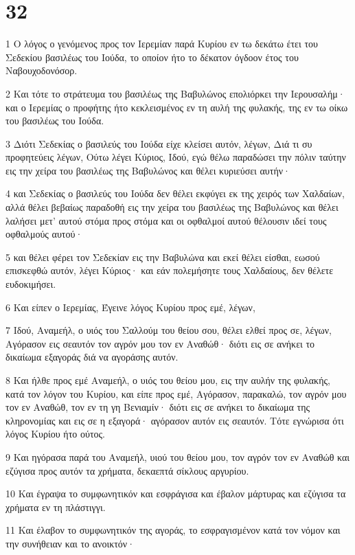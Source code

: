 \chapter{32}

\par 1 Ο λόγος ο γενόμενος προς τον Ιερεμίαν παρά Κυρίου εν τω δεκάτω έτει του Σεδεκίου βασιλέως του Ιούδα, το οποίον ήτο το δέκατον όγδοον έτος του Ναβουχοδονόσορ.
\par 2 Και τότε το στράτευμα του βασιλέως της Βαβυλώνος επολιόρκει την Ιερουσαλήμ· και ο Ιερεμίας ο προφήτης ήτο κεκλεισμένος εν τη αυλή της φυλακής, της εν τω οίκω του βασιλέως του Ιούδα.
\par 3 Διότι Σεδεκίας ο βασιλεύς του Ιούδα είχε κλείσει αυτόν, λέγων, Διά τι συ προφητεύεις λέγων, Ούτω λέγει Κύριος, Ιδού, εγώ θέλω παραδώσει την πόλιν ταύτην εις την χείρα του βασιλέως της Βαβυλώνος και θέλει κυριεύσει αυτήν·
\par 4 και Σεδεκίας ο βασιλεύς του Ιούδα δεν θέλει εκφύγει εκ της χειρός των Χαλδαίων, αλλά θέλει βεβαίως παραδοθή εις την χείρα του βασιλέως της Βαβυλώνος και θέλει λαλήσει μετ' αυτού στόμα προς στόμα και οι οφθαλμοί αυτού θέλουσιν ιδεί τους οφθαλμούς αυτού·
\par 5 και θέλει φέρει τον Σεδεκίαν εις την Βαβυλώνα και εκεί θέλει είσθαι, εωσού επισκεφθώ αυτόν, λέγει Κύριος· και εάν πολεμήσητε τους Χαλδαίους, δεν θέλετε ευδοκιμήσει.
\par 6 Και είπεν ο Ιερεμίας, Έγεινε λόγος Κυρίου προς εμέ, λέγων,
\par 7 Ιδού, Αναμεήλ, ο υιός του Σαλλούμ του θείου σου, θέλει ελθεί προς σε, λέγων, Αγόρασον εις σεαυτόν τον αγρόν μου τον εν Αναθώθ· διότι εις σε ανήκει το δικαίωμα εξαγοράς διά να αγοράσης αυτόν.
\par 8 Και ήλθε προς εμέ Αναμεήλ, ο υιός του θείου μου, εις την αυλήν της φυλακής, κατά τον λόγον του Κυρίου, και είπε προς εμέ, Αγόρασον, παρακαλώ, τον αγρόν μου τον εν Αναθώθ, τον εν τη γη Βενιαμίν· διότι εις σε ανήκει το δικαίωμα της κληρονομίας και εις σε η εξαγορά· αγόρασον αυτόν εις σεαυτόν. Τότε εγνώρισα ότι λόγος Κυρίου ήτο ούτος.
\par 9 Και ηγόρασα παρά του Αναμεήλ, υιού του θείου μου, τον αγρόν τον εν Αναθώθ και εζύγισα προς αυτόν τα χρήματα, δεκαεπτά σίκλους αργυρίου.
\par 10 Και έγραψα το συμφωνητικόν και εσφράγισα και έβαλον μάρτυρας και εζύγισα τα χρήματα εν τη πλάστιγγι.
\par 11 Και έλαβον το συμφωνητικόν της αγοράς, το εσφραγισμένον κατά τον νόμον και την συνήθειαν και το ανοικτόν·
